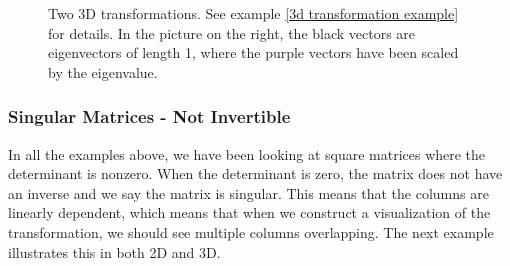 \begin{example}
\begin{figure}
\begin{center}
\end{center}

\caption{{
Two 3D transformations. See example \ref{3d transformation example} for details. In the picture on the right, the black vectors are eigenvectors of length 1, where the purple vectors have been scaled by the eigenvalue.}}
\label{matrix transformation 3d example}
\end{figure}




\end{example}

\subsubsection{Singular Matrices - Not Invertible}

In all the examples above, we have been looking at square matrices where the determinant is nonzero.  When the determinant is zero, the matrix does not have an inverse and we say the matrix is singular.  This means that the columns are linearly dependent, which means that when we construct a visualization of the transformation, we should see multiple columns overlapping. The next example illustrates this in both 2D and 3D.  


